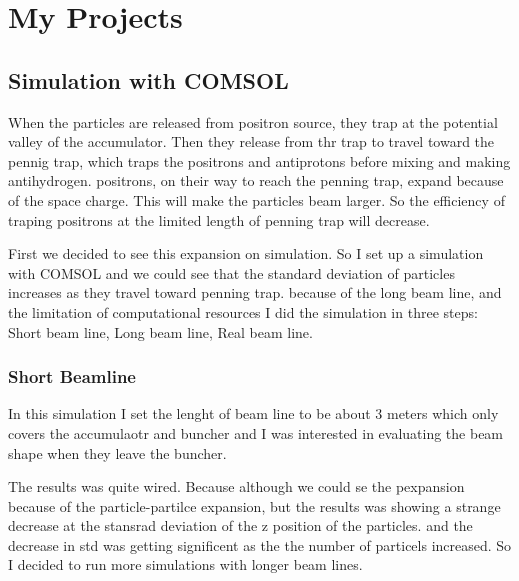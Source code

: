 \documentclass{article}
\begin{document}
\section{My Projects}
\subsection{Simulation with COMSOL}
When the particles are released from positron source, they trap at the potential valley of the accumulator. Then they release from thr trap to travel toward the pennig trap, which traps the positrons and antiprotons before mixing and making antihydrogen.  positrons, on their way to reach the penning trap, expand because of the space charge. This will make the particles beam larger. So the efficiency of traping positrons at the limited length of penning trap will decrease.


First we decided to see this expansion on simulation. So I set up a simulation with COMSOL and we could see that the standard deviation of particles increases as they travel toward penning trap. because of the long beam line, and the limitation of computational resources I did the simulation in three steps: Short beam line, Long beam line, Real beam line.
\subsubsection{Short Beamline}
In this simulation I set the lenght of beam line to be about 3 meters which only covers the accumulaotr and buncher and I was interested in evaluating the beam shape when they leave the buncher.

The results was quite wired. Because although we could se the pexpansion because of the particle-partilce expansion, but the results was showing a strange decrease at the  stansrad deviation of the z position of the particles. and the decrease in std was getting significent as the the number of particels increased. So I decided to run more simulations with longer beam lines.
\end{document}
